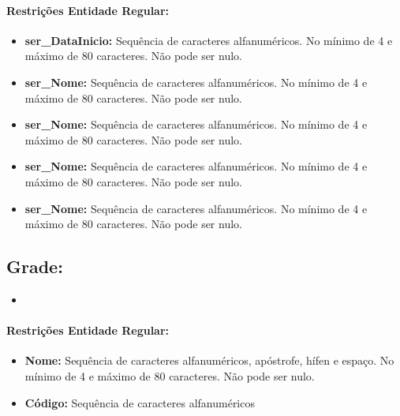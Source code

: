 \documentclass{report}
\begin{document}
\paragraph{Restrições Entidade Regular:}
\begin{itemize}
  \item \textbf{ser\_DataInicio:} Sequência de caracteres alfanuméricos. No mínimo de 4 e máximo de 80 caracteres. Não pode ser nulo.
  \item \textbf{ser\_Nome:} Sequência de caracteres alfanuméricos. No mínimo de 4 e máximo de 80 caracteres. Não pode ser nulo.
  \item \textbf{ser\_Nome:} Sequência de caracteres alfanuméricos. No mínimo de 4 e máximo de 80 caracteres. Não pode ser nulo.
  \item \textbf{ser\_Nome:} Sequência de caracteres alfanuméricos. No mínimo de 4 e máximo de 80 caracteres. Não pode ser nulo.
  \item \textbf{ser\_Nome:} Sequência de caracteres alfanuméricos. No mínimo de 4 e máximo de 80 caracteres. Não pode ser nulo.
\end{itemize}
\subsection{Grade:}
\begin{itemize}
  \item
\end{itemize}
\paragraph{Restrições Entidade Regular:}
\begin{itemize}
  \item \textbf{Nome:} Sequência de caracteres alfanuméricos, apóstrofe, hífen e espaço. No mínimo de 4 e máximo de 80 caracteres. Não pode ser nulo.
  \item \textbf{Código:} Sequência de caracteres alfanuméricos
\end{itemize}
\end{document}
